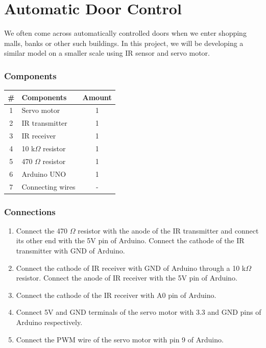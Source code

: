 \chapter{Automatic Door Control}

We often come across automatically controlled doors when we enter shopping malls, banks or other such buildings. In this project, we will be developing a similar model on a smaller scale using IR sensor and servo motor.

\subsection*{Components}
\begin{table}[H]
    \centering
    \begin{tabular}{|c|l|c|}\hline
     \textbf{\#} & \textbf{Components} &  \textbf{Amount}\\\hline
     1 & Servo motor &  1\\\hline
     2 & IR transmitter  & 1\\\hline
     3 & IR receiver  &  1\\\hline
     4 & 10 k$\Omega$ resistor  &  1\\\hline
     5 & 470 $\Omega$ resistor   &  1\\\hline
     6 & Arduino UNO & 1 \\\hline
     7 & Connecting wires & - \\\hline
    \end{tabular}
\end{table}

\subsection*{Connections}

\begin{enumerate}[leftmargin=*]
    \item Connect the 470 $\Omega$ resistor with the anode of the IR transmitter and connect its other end with the 5V pin of Arduino. Connect the cathode of the IR transmitter with GND of Arduino.
    \item Connect the cathode of IR receiver with GND of Arduino through a 10 k$\Omega$ resistor. Connect the anode of IR receiver with the 5V pin of Arduino.
    \item Connect the cathode of the IR receiver with A0 pin of Arduino. 
    \item Connect 5V and GND terminals of the servo motor with 3.3 and GND pins of Arduino respectively. 
    \item Connect the PWM wire of the servo motor with pin 9 of Arduino.
  
\end{enumerate}

